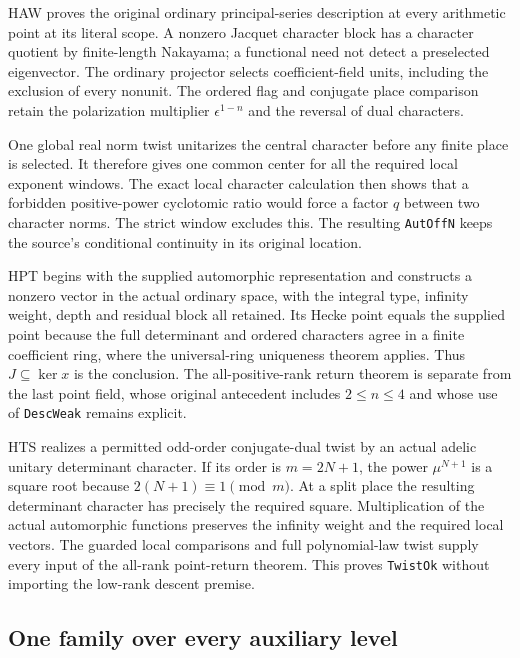 HAW proves the original ordinary principal-series description at
every arithmetic point at its literal scope.  A nonzero Jacquet
character block has a character quotient by finite-length
Nakayama; a functional need not detect a preselected eigenvector.
The ordinary projector selects coefficient-field units, including
the exclusion of every nonunit.  The ordered flag and conjugate
place comparison retain the polarization multiplier
$\epsilon^{1-n}$ and the reversal of dual characters.

One global real norm twist unitarizes the central character before
any finite place is selected.  It therefore gives one common center
for all the required local exponent windows.  The exact local
character calculation then shows that a forbidden positive-power
cyclotomic ratio would force a factor $q$ between two character
norms.  The strict window excludes this.  The resulting
\texttt{Aut\allowbreak Off\allowbreak N} keeps the source's conditional continuity in
its original location.

HPT begins with the supplied automorphic representation and
constructs a nonzero vector in the actual ordinary space, with
the integral type, infinity weight, depth and residual block all
retained.  Its Hecke point equals the supplied point because the
full determinant and ordered characters agree in a finite
coefficient ring, where the universal-ring uniqueness theorem
applies.  Thus $J\subseteq\ker x$ is the conclusion.  The
all-positive-rank return theorem is separate from the last point
field, whose original antecedent includes $2\le n\le4$ and
whose use of \texttt{Desc\allowbreak Weak} remains explicit.

HTS realizes a permitted odd-order conjugate-dual twist by an
actual adelic unitary determinant character.  If its order is
$m=2N+1$, the power $\mu^{N+1}$ is a square root because
$2(N+1)\equiv1\pmod m$.  At a split place the resulting
determinant character has precisely the required square.
Multiplication of the actual automorphic functions preserves the
infinity weight and the required local vectors.  The guarded
local comparisons and full polynomial-law twist supply every
input of the all-rank point-return theorem.  This proves
\texttt{Twist\allowbreak Ok} without importing the low-rank descent premise.

\subsection{One family over every auxiliary level}

